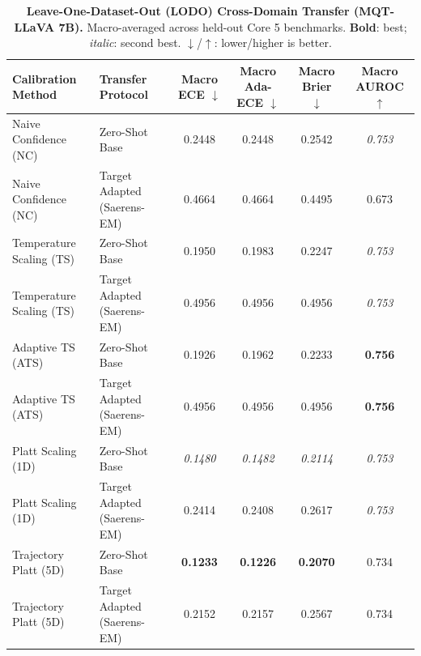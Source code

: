 \begin{table}[t]
\setlength{\tabcolsep}{4pt}
\renewcommand{\arraystretch}{1.05}
\centering
\footnotesize
\begin{tabular}{llcccc}
\toprule
\textbf{Calibration Method} & \textbf{Transfer Protocol} & \textbf{Macro ECE} $\downarrow$ & \textbf{Macro Ada-ECE} $\downarrow$ & \textbf{Macro Brier} $\downarrow$ & \textbf{Macro AUROC} $\uparrow$ \\
\midrule
Naive Confidence (NC) & Zero-Shot Base & 0.2448 & 0.2448 & 0.2542 & \textit{0.753} \\
Naive Confidence (NC) & Target Adapted (Saerens-EM) & 0.4664 & 0.4664 & 0.4495 & 0.673 \\
Temperature Scaling (TS) & Zero-Shot Base & 0.1950 & 0.1983 & 0.2247 & \textit{0.753} \\
Temperature Scaling (TS) & Target Adapted (Saerens-EM) & 0.4956 & 0.4956 & 0.4956 & \textit{0.753} \\
Adaptive TS (ATS) & Zero-Shot Base & 0.1926 & 0.1962 & 0.2233 & \textbf{0.756} \\
Adaptive TS (ATS) & Target Adapted (Saerens-EM) & 0.4956 & 0.4956 & 0.4956 & \textbf{0.756} \\
Platt Scaling (1D) & Zero-Shot Base & \textit{0.1480} & \textit{0.1482} & \textit{0.2114} & \textit{0.753} \\
Platt Scaling (1D) & Target Adapted (Saerens-EM) & 0.2414 & 0.2408 & 0.2617 & \textit{0.753} \\
Trajectory Platt (5D) & Zero-Shot Base & \textbf{0.1233} & \textbf{0.1226} & \textbf{0.2070} & 0.734 \\
Trajectory Platt (5D) & Target Adapted (Saerens-EM) & 0.2152 & 0.2157 & 0.2567 & 0.734 \\
\bottomrule
\end{tabular}
\caption{\textbf{Leave-One-Dataset-Out (LODO) Cross-Domain Transfer (MQT-LLaVA 7B).} Macro-averaged across held-out Core 5 benchmarks. \textbf{Bold}: best; \textit{italic}: second best. $\downarrow$/$\uparrow$: lower/higher is better.}
\label{tab:lodo_transfer_mqt}
\end{table}
